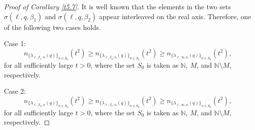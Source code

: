 \documentclass[reqno,12pt,centertags]{amsart}
\numberwithin{equation}{section}
\theoremstyle{definition}
\begin{document}
\begin{proof}[Proof of Corollary \ref{t5.7}]
It is well known that the elements in the two sets $\sigma(\ell, q, \beta_1)$ and $\sigma(\ell, q, \beta_2)$ appear interleaved on the real axis.
Therefore, one of the following two cases holds.

Case 1:
$$n_{\{\lambda_{\ell, \beta_{1}, n}(q)\}_{n\in S_0}}(t^{2})
    \geq n_{\{\lambda_{\ell, \beta_{2}, n}(q)\}_{n\in S_0}}(t^{2})
    \geq n_{\{\lambda_{\ell, \infty, n}(q)\}_{n\in S_0}}(t^{2}),$$
for all sufficiently large $t>0$, where the set $S_0$ is taken as $\mathbb{N}$, $M$, and $\mathbb{N}\setminus M$, respectively.

Case 2:
$$n_{\{\lambda_{\ell, \beta_{2}, n}(q)\}_{n\in S_0}}(t^{2})
    \geq n_{\{\lambda_{\ell, \beta_{1}, n}(q)\}_{n\in S_0}}(t^{2})
    \geq n_{\{\lambda_{\ell, \infty, n}(q)\}_{n\in S_0}}(t^{2}),$$
for all sufficiently large $t>0$, where the set $S_0$ is taken as $\mathbb{N}$, $M$, and $\mathbb{N}\setminus M$, respectively.


\end{proof}
\end{document}
